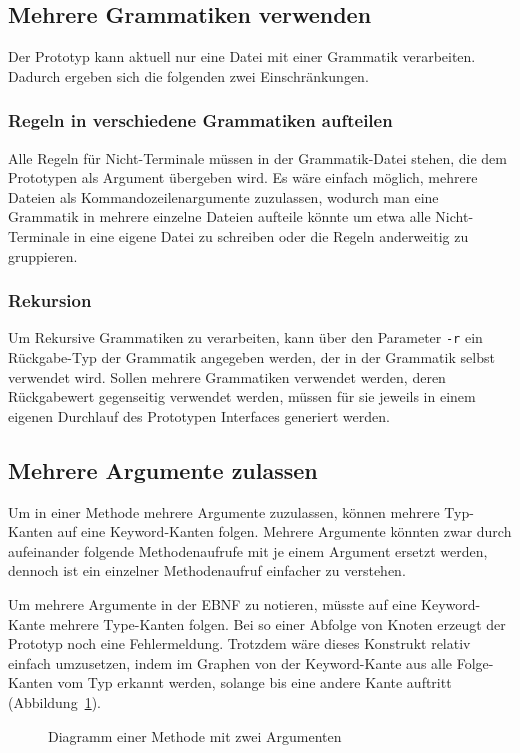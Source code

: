 \documentclass[../InterneDSLs.tex]{subfiles}
\begin{document}
\subsection{Mehrere Grammatiken verwenden}
Der Prototyp kann aktuell nur eine Datei mit einer Grammatik verarbeiten. Dadurch ergeben sich die folgenden zwei Einschränkungen.

\subsubsection{Regeln in verschiedene Grammatiken aufteilen}
Alle Regeln für Nicht-Terminale müssen in der Grammatik-Datei stehen, die dem Prototypen als Argument übergeben wird. Es wäre einfach möglich, mehrere Dateien als Kommandozeilenargumente zuzulassen, wodurch man eine Grammatik in mehrere einzelne Dateien aufteile könnte um etwa alle Nicht-Terminale in eine eigene Datei zu schreiben oder die Regeln anderweitig zu gruppieren.

\subsubsection{Rekursion}
Um Rekursive Grammatiken zu verarbeiten, kann über den Parameter \verb|-r| ein Rückgabe-Typ der Grammatik angegeben werden, der in der Grammatik selbst verwendet wird. Sollen mehrere Grammatiken verwendet werden, deren Rückgabewert gegenseitig verwendet werden, müssen für sie jeweils in einem eigenen Durchlauf des Prototypen Interfaces generiert werden.

\subsection{Mehrere Argumente zulassen}
Um in einer Methode mehrere Argumente zuzulassen, können mehrere Typ-Kanten auf eine Keyword-Kanten folgen. Mehrere Argumente könnten zwar durch aufeinander folgende Methodenaufrufe mit je einem Argument ersetzt werden, dennoch ist ein einzelner Methodenaufruf einfacher zu verstehen.

Um mehrere Argumente in der EBNF zu notieren, müsste auf eine Keyword-Kante mehrere Type-Kanten folgen. Bei so einer Abfolge von Knoten erzeugt der Prototyp noch eine Fehlermeldung. Trotzdem wäre dieses Konstrukt relativ einfach umzusetzen, indem im Graphen von der Keyword-Kante aus alle Folge-Kanten vom Typ \gqq{TYPE]} erkannt werden, solange bis eine andere Kante auftritt (Abbildung~\ref{FIG:DiagramMethodTwoArguments}).

\begin{figure}[ht]
\centering
{}
\caption{Diagramm einer Methode mit zwei Argumenten}
\label{FIG:DiagramMethodTwoArguments}
\end{figure}
\end{document}
